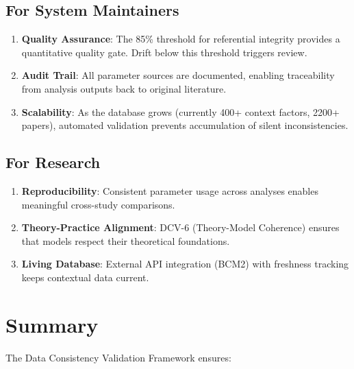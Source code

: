 \subsection{For System Maintainers}

\begin{enumerate}
    \item \textbf{Quality Assurance}: The 85\% threshold for referential integrity provides a quantitative quality gate. Drift below this threshold triggers review.

    \item \textbf{Audit Trail}: All parameter sources are documented, enabling traceability from analysis outputs back to original literature.

    \item \textbf{Scalability}: As the database grows (currently 400+ context factors, 2200+ papers), automated validation prevents accumulation of silent inconsistencies.
\end{enumerate}

\subsection{For Research}

\begin{enumerate}
    \item \textbf{Reproducibility}: Consistent parameter usage across analyses enables meaningful cross-study comparisons.

    \item \textbf{Theory-Practice Alignment}: DCV-6 (Theory-Model Coherence) ensures that models respect their theoretical foundations.

    \item \textbf{Living Database}: External API integration (BCM2) with freshness tracking keeps contextual data current.
\end{enumerate}

\section{Summary}
\label{sec:vc-summary}

The Data Consistency Validation Framework ensures:

